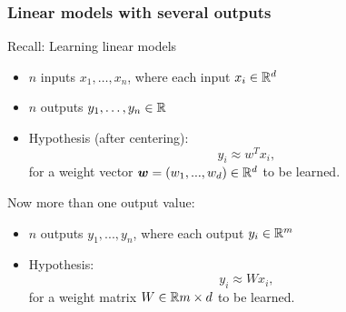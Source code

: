 \documentclass[aspectratio=149]{beamer}
\begin{document}
\begin{frame}
  \frametitle{Linear models with several outputs}
  Recall: Learning linear models
  \begin{itemize}
    \item $n$ inputs $x_1,\dots,x_n$, where each input $x_i \in \mathbb{R}^d$
    \item $n$ outputs $y_1,\dots,y_n \in \mathbb{R}$
    \item Hypothesis (after centering):
          \begin{equation}
            y_i \approx w^T x_i ,
          \end{equation}
          for a weight vector $\bm{w} = (w_1,...,w_d) \in \mathbb{R}^d$ to be learned.
  \end{itemize}

  Now more than one output value:
  \begin{itemize}
    \item $n$ outputs $y_1,...,y_n$, where each output $y_i \in \mathbb{R}^m$
    \item Hypothesis:
          \begin{equation}
            y_i \approx W x_i,
          \end{equation}
          for a weight matrix $W \in \mathbb{R}{m\times d}$ to be learned.
  \end{itemize}
\end{frame}
\end{document}
